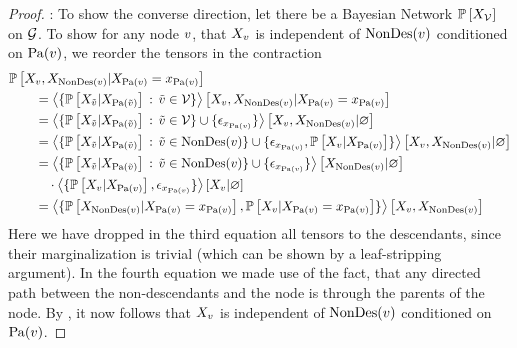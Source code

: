 \begin{proof}
    \proofleftsymbol:
    To show the converse direction, let there be a Bayesian Network $\mathbb{P}\left[X_{\mathcal{V}}\right]$ on $\mathcal{G}$.
    To show for any node $v$, that $X_{v}$ is independent of $\mathrm{NonDes}(v)$ conditioned on $\mathrm{Pa}(v)$, we reorder the tensors in the contraction
    \begin{align*}
        & \condprobof{\catvariableof{\node},\catvariableof{\nondescendantsof{\node}}}{\indexedcatvariableof{\parentsof{\node}}} \\
        & \quad\quad = \normalizationofwrt{
            \{\condprobof{\catvariableof{\secnode}}{\catvariableof{\parentsof{\secnode}}} \, : \, \secnode\in\nodes\}
        }
        {\catvariableof{\node},\catvariableof{\nondescendantsof{\node}}}
        {\indexedcatvariableof{\parentsof{\node}}} \\
        & \quad\quad  = \normalizationof{
            \{\condprobof{\catvariableof{\secnode}}{\catvariableof{\parentsof{\secnode}}} \, : \, \secnode\in\nodes\} \cup \{\onehotmapof{\catindexof{\parentsof{\node}}}\}
        }
        {\catvariableof{\node},\catvariableof{\nondescendantsof{\node}}}\\
        &  \quad\quad = \normalizationof{
            \{\condprobof{\catvariableof{\secnode}}{\catvariableof{\parentsof{\secnode}}} \, : \, \secnode\in\nondescendantsof{\node}\} \cup \{\onehotmapof{\catindexof{\parentsof{\node}}}, \condprobof{\catvariableof{\node}}{\catvariableof{\parentsof{\node}}} \}
        }
        {\catvariableof{\node},\catvariableof{\nondescendantsof{\node}}} \\
        &  \quad\quad =  %
        \normalizationof{
            \{\condprobof{\catvariableof{\secnode}}{\catvariableof{\parentsof{\secnode}}} \, : \, \secnode\in\nondescendantsof{\node}\} \cup \{\onehotmapof{\catindexof{\parentsof{\node}}}\}
        }
        {\catvariableof{\nondescendantsof{\node}}} \\
        & \quad\quad  \quad  \cdot \normalizationof{
            \{\condprobof{\catvariableof{\node}}{\catvariableof{\parentsof{\node}}},\onehotmapof{\catindexof{\parentsof{\node}}}\}
        }
        {\catvariableof{\node}} \\
        & \quad\quad  = \contractionof{\{
        \condprobof{\catvariableof{\nondescendantsof{\node}}}{\indexedcatvariableof{\parentsof{\node}}},
            \condprobof{\catvariableof{\node}}{\indexedcatvariableof{\parentsof{\node}}}
            \}}{\catvariableof{\node},\catvariableof{\nondescendantsof{\node}}}
    \end{align*}
    Here we have dropped in the third equation all tensors to the descendants, since their marginalization is trivial (which can be shown by a leaf-stripping argument).
    In the fourth equation we made use of the fact, that any directed path between the non-descendants and the node is through the parents of the node.
    By , it now follows that $X_{v}$ is independent of $\mathrm{NonDes}(v)$ conditioned on $\mathrm{Pa}(v)$.
\end{proof}

